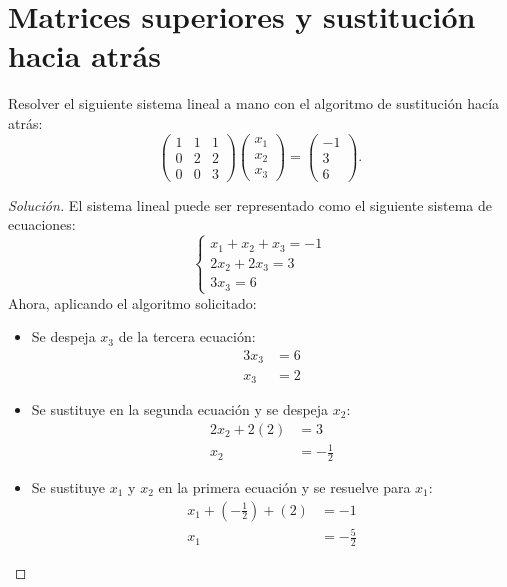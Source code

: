 \documentclass[12pt]{book}
\newenvironment{solucion}
  {\renewcommand\qedsymbol{$\square$}\begin{proof}[Solución]}
  {\end{proof}}
\begin{document}
\section{Matrices superiores y sustitución hacia atrás}
\eje Resolver el siguiente sistema lineal a mano con el algoritmo de sustitución hacía atrás:
    \[
        \begin{pmatrix}
            1&1&1\\
            0&2&2\\
            0&0&3
        \end{pmatrix}\begin{pmatrix}
            x_1\\
            x_2\\
            x_3
        \end{pmatrix}=\begin{pmatrix}
            -1\\
            3\\6
        \end{pmatrix}.
    \]
\begin{solucion}    
El sistema lineal puede ser representado como el siguiente sistema de ecuaciones:
    \[
        \begin{cases}
            x_1+x_2+x_3=-1\\
            2x_2+2x_3=3\\
            3x_3=6
        \end{cases}
    \]
Ahora, aplicando el algoritmo solicitado:
\begin{itemize}
    \item Se despeja $x_3$ de la tercera ecuación:
        \begin{align*}
            3x_3&=6 \\ 
            x_3&=2
        \end{align*}
    \item Se sustituye en la segunda ecuación y se despeja $x_2$:
        \begin{align*}
            2x_2+2(2)&=3\\
            x_2&=-\frac{1}{2}
        \end{align*}
    \item Se sustituye $x_1$ y $x_2$ en la primera ecuación y se resuelve para $x_1$:
        \begin{align*}
            x_1+(-\frac{1}{2})+(2)&=-1\\
            x_1&=-\frac{5}{2}
        \end{align*}
\end{itemize}

\end{solucion}
\end{document}
